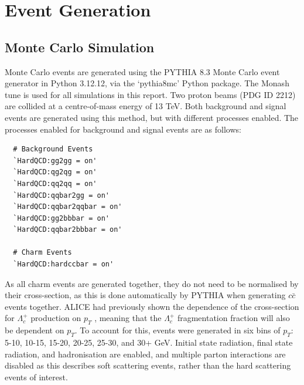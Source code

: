 \documentclass[12pt]{article}
\begin{document}





\newpage
\section{Event Generation}
\label{sec:event_generation}

\subsection{Monte Carlo Simulation}
Monte Carlo events are generated using the PYTHIA 8.3 Monte Carlo event generator in Python 3.12.12, via the `pythia8mc' Python package. The Monash tune is used for all simulations in this report. Two proton beams (PDG ID 2212) are collided at a centre-of-mass energy of 13 TeV. Both background and signal events are generated using this method, but with different processes enabled. The processes enabled for background and signal events are as follows:
\begin{verbatim}
  # Background Events
  `HardQCD:gg2gg = on'
  `HardQCD:qg2qg = on'
  `HardQCD:qq2qq = on'
  `HardQCD:qqbar2gg = on'
  `HardQCD:qqbar2qqbar = on'
  `HardQCD:gg2bbbar = on'
  `HardQCD:qqbar2bbbar = on'

  # Charm Events
  `HardQCD:hardccbar = on'
\end{verbatim}
As all charm events are generated together, they do not need to be normalised by their cross-section, as this is done automatically by PYTHIA when generating $c\bar{c}$ events together. ALICE had previously shown the dependence of the cross-section for $\Lambda_c^+$ production on $p_T$ \cite{fragfrac}, meaning that the $\Lambda_c^+$ fragmentation fraction will also be dependent on $p_T$. To account for this, events were generated in six bins of $p_T$: 5-10, 10-15, 15-20, 20-25, 25-30, and 30+ GeV. Initial state radiation, final state radiation, and hadronisation are enabled, and multiple parton interactions are disabled as this describes soft scattering events, rather than the hard scattering events of interest.
\end{document}
